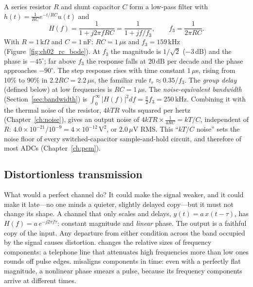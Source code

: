 
\begin{worked}
A series resistor $R$ and shunt capacitor $C$ form a low-pass filter with
$h(t)=\frac{1}{RC}e^{-t/RC}u(t)$ and
\[
H(f)=\frac{1}{1+j2\pi fRC}=\frac{1}{1+jf/f_{3}},\qquad f_3=\frac{1}{2\pi RC}.
\]
With $R=1$\,k$\Omega$ and $C=1$\,nF: $RC=1\,\mu$s and $f_3=159$\,kHz (Figure~\ref{fig:ch02_rc_bode}).
At $f_3$ the magnitude is $1/\sqrt2$ ($-3$\,dB) and the phase is $-45^\circ$; far above $f_3$ the
response falls at 20\,dB per decade and the phase approaches $-90^\circ$. The step response rises
with time constant $1\,\mu$s, rising from 10\% to 90\% in $2.2RC=2.2\,\mu$s, the familiar rule
$t_r\approx0.35/f_3$. The \emph{group delay} (defined below) at low frequencies is
$RC=1\,\mu$s. The \emph{noise-equivalent bandwidth} (Section~\ref{sec:bandwidth}) is
$\int_0^\infty|H(f)|^2df=\frac{\pi}{2}f_3=250$\,kHz. Combining it with the thermal noise of the
resistor, $4kTR$ volts squared per hertz (Chapter~\ref{ch:noise}), gives an output noise of
$4kTR\times\frac{1}{4RC}=kT/C$, independent of $R$: $4.0\times10^{-21}/10^{-9}=4\times10^{-12}\,\text{V}^2$, or
$2.0\,\mu$V RMS. This ``$kT/C$ noise'' sets the noise floor of every switched-capacitor
sample-and-hold circuit, and therefore of most ADCs (Chapter~\ref{ch:pcm}).
\end{worked}

\subsection{Distortionless transmission}
\label{sec:ch02:distortionless}

What would a perfect channel do? It could make the signal weaker, and it could make it late---no
one minds a quieter, slightly delayed copy---but it must not change its shape. A channel that only
scales and delays, $y(t)=a\,x(t-\tau)$, has $H(f)=a\,e^{-j2\pi f\tau}$: constant magnitude and
\emph{linear} phase. The output is a faithful copy of the input. Any departure from either condition
across the band occupied by the signal causes distortion.  changes the
relative sizes of frequency components: a telephone line that attenuates high frequencies more than
low ones rounds off pulse edges.  misaligns components in time: even with a
perfectly flat magnitude, a nonlinear phase smears a pulse, because its frequency components arrive
at different times.

